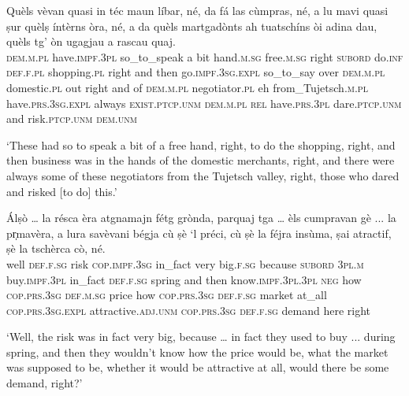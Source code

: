 \begin{linenumbers}
\gll Quèls vèvan quasi in téc maun líbar, né, da fá las cùmpras, né, a lu mavi quasi ṣur quèlṣ íntèrns òra, né, a da quèls martgadònts ah tuatschíns òi adina dau, quèls tg’ òn ugagjau a rascau quaj.\\
  \textsc{dem.m.pl} have.\textsc{impf.3pl} so\_to\_speak a bit hand.\textsc{m.sg} free.\textsc{m.sg} right \textsc{subord} do.\textsc{inf} \textsc{def.f.pl} shopping.\textsc{pl} right and then go.\textsc{impf.3sg.expl} so\_to\_say over \textsc{dem.m.pl} domestic.\textsc{pl} out right and of \textsc{dem.m.pl} negotiator.\textsc{pl} eh from\_Tujetsch.\textsc{m.pl} have.\textsc{prs.3sg}.\textsc{expl} always \textsc{exist.ptcp.unm} \textsc{dem.m.pl} \textsc{rel} have.\textsc{prs.3pl} dare.\textsc{ptcp.unm} and risk.\textsc{ptcp.unm} \textsc{dem.unm}\\
\end{linenumbers}
\medskip
\glt `These had so to speak a bit of a free hand, right, to do the shopping, right, and then business was in the hands of the domestic merchants, right, and there were always some of these negotiators from the Tujetsch valley, right, those who dared and risked [to do] this.'
\medskip

 \begin{linenumbers}
\gll Álṣò … la résca èra atgnamajn fétg grònda, parquaj tga … èls cumpravan gè ... la pr̩mavèra, a lura savèvani bégja cù ṣè `l préci, cù ṣè la féjra insùma, ṣai atractif, ṣè la tschèrca cò, né.\\
well {} \textsc{def.f.sg} risk \textsc{cop.impf.3sg} in\_fact very big.\textsc{f.sg} because \textsc{subord} {} \textsc{3pl.m} buy.\textsc{impf.3pl} in\_fact {} \textsc{def.f.sg} spring and then know.\textsc{impf.3pl.3pl} \textsc{neg} how \textsc{cop.prs.3sg} \textsc{def.m.sg} price how \textsc{cop.prs.3sg} \textsc{def.f.sg} market at\_all \textsc{cop.prs.3sg.expl} attractive.\textsc{adj.unm} \textsc{cop.prs.3sg} \textsc{def.f.sg} demand here right \\
\end{linenumbers}
\medskip
\glt `Well, the risk was in fact very big, because … in fact they used to buy ... during spring, and then they wouldn’t know how the price would be, what the market was supposed to be, whether it would be attractive at all, would there be some demand, right?'
\medskip

